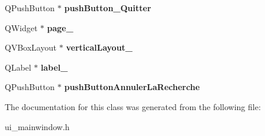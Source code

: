 \begin{DoxyCompactItemize}
\item 
\hypertarget{class_ui___main_window_ae54cc2b98c90284565a9dd3ce00ddb67}{Q\-Push\-Button $\ast$ {\bfseries push\-Button\-\_\-\-Quitter}}\label{class_ui___main_window_ae54cc2b98c90284565a9dd3ce00ddb67}

\item 
\hypertarget{class_ui___main_window_ac682cb2a9b686ca7c3d29771ad9ccb48}{Q\-Widget $\ast$ {\bfseries page\-\_}}\label{class_ui___main_window_ac682cb2a9b686ca7c3d29771ad9ccb48}

\item 
\hypertarget{class_ui___main_window_afcc20a3d5058037a00cdc6122f231848}{Q\-V\-Box\-Layout $\ast$ {\bfseries vertical\-Layout\-\_}}\label{class_ui___main_window_afcc20a3d5058037a00cdc6122f231848}

\item 
\hypertarget{class_ui___main_window_a2e2516d755e4dd53fc905dabddf2738a}{Q\-Label $\ast$ {\bfseries label\-\_}}\label{class_ui___main_window_a2e2516d755e4dd53fc905dabddf2738a}

\item 
\hypertarget{class_ui___main_window_af984dda6e986374c3b4e1f5d1e3704d1}{Q\-Push\-Button $\ast$ {\bfseries push\-Button\-Annuler\-La\-Recherche}}\label{class_ui___main_window_af984dda6e986374c3b4e1f5d1e3704d1}

\end{DoxyCompactItemize}


The documentation for this class was generated from the following file\-:\begin{DoxyCompactItemize}
\item 
ui\-\_\-mainwindow.\-h\end{DoxyCompactItemize}
